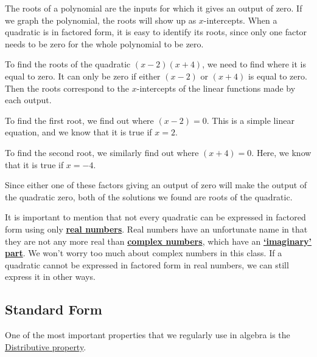 \begin{presentation}
\begin{defn}[Root]
The roots of a polynomial are the inputs for which it gives an output of zero.  If we graph the polynomial, the roots will show up as $x$-intercepts.  When a quadratic is in factored form, it is easy to identify its roots, since only one factor needs to be zero for the whole polynomial to be zero.
\end{defn}
\end{presentation}

\begin{presentation}
\begin{example}
To find the roots of the quadratic $(x-2)(x+4)$, we need to find where it is equal to zero.  It can only be zero if either $(x-2)$ or $(x+4)$ is equal to zero.  Then the roots correspond to the $x$-intercepts of the linear functions made by each output.

To find the first root, we find out where $(x-2) = 0$.  This is a simple linear equation, and we know that it is true if $x = 2$.

To find the second root, we similarly find out where $(x+4) = 0$.  Here, we know that it is true if $x = -4$.

Since either one of these factors giving an output of zero will make the output of the quadratic zero, both of the solutions we found are roots of the quadratic.

\end{example}
\end{presentation}

It is important to mention that not every quadratic can be expressed in factored form using only \hyperref[Real Number]{\textbf{real numbers}}. Real numbers have an unfortunate name in that they are not any more real than \hyperref[Complex Number]{\textbf{complex numbers}}, which have an \hyperref[Imaginary Constant]{\textbf{`imaginary' part}}.  We won't worry too much about complex numbers in this class.  If a quadratic cannot be expressed in factored form in real numbers, we can still express it in other ways.

\subsection*{Standard Form}


One of the most important properties that we regularly use in algebra is the \hyperref[Distributive Property]{Distributive property}.

